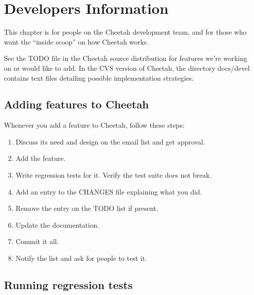 \section{Developers Information}
\label{developer}

This chapter is for people on the Cheetah development team, and for those who
want the ``inside scoop'' on how Cheetah works.

See the TODO file in the Cheetah source distribution for features we're
working on or would like to add.  In the CVS version of Cheetah, the directory
docs/devel contains text files detailing possible implementation strategies.

\subsection{Adding features to Cheetah}

Whenever you add a feature to Cheetah, follow these steps:

\begin{enumerate}
     
\item Discuss its need and design on the email list and get approval.
     
\item Add the feature.
     
\item Write regression tests for it.  Verify the test suite does not break.
     
\item Add an entry to the CHANGES file explaining what you did.
     
\item Remove the entry on the TODO list if present.
     
\item Update the documentation.
     
\item Commit it all.
     
\item Notify the list and ask for people to test it.

\end{enumerate}


\subsection{Running regression tests}

